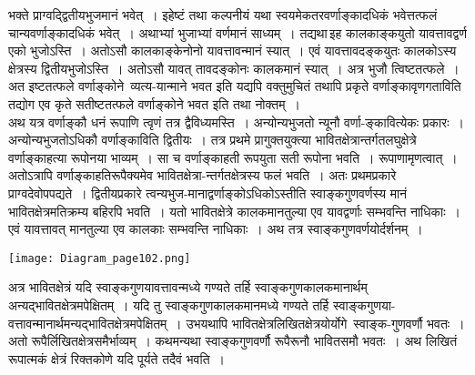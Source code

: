 \documentclass[11pt, openany]{book}
\begin{document}
\newpage

\begin{sloppypar}
\noindent भक्ते प्राग्वद्द्वितीयभुजमानं भवेत्~। इहेष्टं तथा कल्पनीयं यथा स्वयमेकतरवर्णाङ्कादधिकं भवेत्तत्फलं चान्यवर्णाङ्कादधिकं भवेत्~। अथाभ्यां भुजाभ्यां वर्णमानं साध्यम्~। तद्यथा\textendash \,इह कालकाङ्कयुतो यावत्तावद्वर्ण एको भुजोऽस्ति~। अतोऽसौ कालकाङ्केनोनो यावत्तावन्मानं स्यात्~। एवं यावत्तावदङ्कयुतः कालकोऽस्य क्षेत्रस्य द्वितीयभुजोऽस्ति~। अतोऽसौ यावत् तावदङ्कोनः कालकमानं स्यात्~। अत्र भुजौ त्विष्टतत्फले~। अत इष्टतत्फले वर्णाङ्कोने~व्यत्य-यान्माने भवत इति यद्यपि वक्तुमुचितं तथापि प्रकृते वर्णाङ्कावृणगताविति तद्योग एव कृते सतीष्टतत्फले वर्णाङ्कोने भवत इति तथा नोक्तम्~।\\

अथ यत्र वर्णाङ्कौ धनं रूपाणि त्वृणं तत्र द्वैविध्यमस्ति~। अन्योन्यभुजतो न्यूनौ वर्णा-ङ्कावित्येकः प्रकारः~। अन्योन्यभुजतोऽधिकौ वर्णाङ्काविति द्वितीयः~। तत्र प्रथमे  प्रागुक्तयुक्त्या भावितक्षेत्रान्तर्गतलघुक्षेत्रे वर्णाङ्काहत्या रूपोनया भाव्यम्~। सा च वर्णाङ्काहती रूपयुता सती रूपोना भवति~। रूपाणामृणत्वात्~। अतोऽत्रापि वर्णाङ्काहतिरूपैक्यमेव भावितक्षेत्रा-न्तर्गतक्षेत्रस्य फलं भवति~। अतः प्रथमप्रकारे प्राग्वदेवोपपद्यते~। द्वितीयप्रकारे त्वन्यभुज-मानाद्वर्णाङ्कोऽधिकोऽस्तीति स्वाङ्कगुणवर्णस्य मानं भावितक्षेत्रमतिक्रम्य बहिरपि भवति~। यतो भावितक्षेत्रे कालकमानतुल्या एव यावद्वर्णाः सम्भवन्ति नाधिकाः~। एवं यावत्तावत् मानतुल्या एव कालकाः सम्भवन्ति नाधिकाः~। अथ तत्र स्वाङ्कगुणवर्णयोर्दर्शनम्~।\\

\begin{center}
\texttt{[image: Diagram\_page102.png]}
\end{center}

अत्र भावितक्षेत्रं यदि स्वाङ्कगुणयावत्तावन्मध्ये गण्यते तर्हि स्वाङ्कगुणकालकमानार्थम् अन्यद्भावितक्षेत्रमपेक्षितम्~। यदि तु स्वाङ्कगुणकालकमानमध्ये गण्यते तर्हि स्वाङ्कगुणया-वत्तावन्मानार्थमन्यद्भावितक्षेत्रमपेक्षितम्~। उभयथापि भावितक्षेत्रलिखितक्षेत्रयोर्योगे~स्वाङ्क-गुणवर्णौ भवतः~। अतो रूपैर्लिखितक्षेत्रसमैर्भाव्यम्~। कथमन्यथा स्वाङ्कगुणवर्णौ रूपैरूनौ भावितसमौ भवतः~। अथ लिखितं रूपात्मकं क्षेत्रं रिक्तकोणे यदि पूर्यते तदैवं भवति~।
\end{sloppypar}

\newpage
\end{document}
